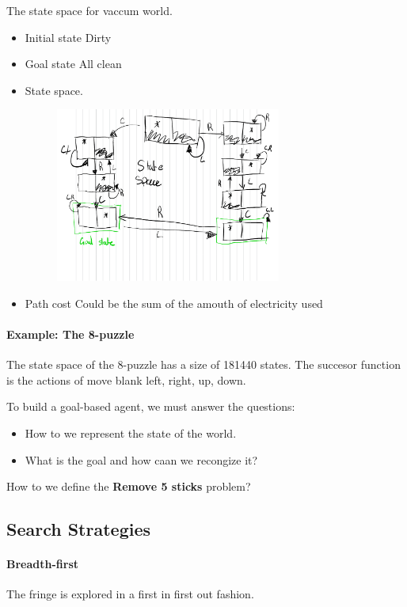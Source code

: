\documentclass{article}
\begin{document}
The state space for vaccum world.
\begin{itemize}
  \item Initial state 
    \subitem Dirty
  \item Goal state
    \subitem All clean
  \item State space.
    \subitem 
    \begin{figure}[H]
      \center
      \includegraphics[width=0.7\textwidth]{./statespace.pdf}
    \end{figure}
  \item Path cost
    \subitem Could be the sum of the amouth of electricity used
\end{itemize}

\paragraph{Example: The 8-puzzle}
The state space of the 8-puzzle has a size of 181440 states. The succesor
function is the actions of move blank left, right, up, down.


To build a goal-based agent, we must answer the questions:
\begin{itemize}
  \item How to we represent the state of the world.
  \item What is the goal and how caan we recongize it?
\end{itemize}

How to we define the \textbf{Remove 5 sticks} problem?

\subsection{Search Strategies}

\paragraph{Breadth-first}
The fringe is explored in a first in first out fashion. 
\end{document}
